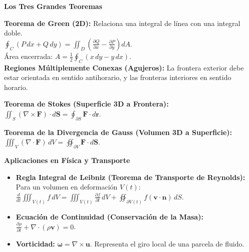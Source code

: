 \documentclass[10pt, landscape, twocolumn]{article}
\newcommand{\cheatsheetsubsection}[1]{
    \vspace{0.5em}
    {\color{themeblue}\normalsize\bfseries #1} \par
    \vspace{0.2em}
}
\begin{document}
\cheatsheetsubsection{Los Tres Grandes Teoremas}
\textbf{Teorema de Green (2D):} Relaciona una integral de línea con una integral doble. \\
$\oint_C (P\,dx + Q\,dy) = \iint_D \left(\frac{\partial Q}{\partial x} - \frac{\partial P}{\partial y}\right) dA$. \\
Área encerrada: $A = \frac{1}{2} \oint_C (x\,dy - y\,dx)$. \\
\textbf{Regiones Múltiplemente Conexas (Agujeros):} La frontera exterior debe estar orientada en sentido antihorario, y las fronteras interiores en sentido horario.

\textbf{Teorema de Stokes (Superficie 3D a Frontera):} 
$\iint_S (\nabla \times \mathbf{F}) \cdot d\mathbf{S} = \oint_{\partial S} \mathbf{F} \cdot d\mathbf{r}$.
\begin{center}
\end{center}

\textbf{Teorema de la Divergencia de Gauss (Volumen 3D a Superficie):} \\
$\iiint_V (\nabla \cdot \mathbf{F}) \, dV = \oiint_{\partial V} \mathbf{F} \cdot d\mathbf{S}$.

\cheatsheetsubsection{Aplicaciones en Física y Transporte}
\begin{itemize}[leftmargin=*, nosep]
    \item \textbf{Regla Integral de Leibniz (Teorema de Transporte de Reynolds):} Para un volumen en deformación $V(t)$: \\
    $\frac{d}{dt} \iiint_{V(t)} f \, dV = \iiint_{V(t)} \frac{\partial f}{\partial t} \, dV + \oiint_{\partial V(t)} f(\mathbf{v} \cdot \mathbf{n}) \, dS$.
    \item \textbf{Ecuación de Continuidad (Conservación de la Masa):} $\frac{\partial \rho}{\partial t} + \nabla \cdot (\rho \mathbf{v}) = 0$.
    \item \textbf{Vorticidad:} $\boldsymbol{\omega} = \nabla \times \mathbf{u}$. Representa el giro local de una parcela de fluido.
\end{itemize}
\end{document}
